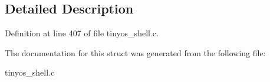 \subsection{Detailed Description}


Definition at line 407 of file tinyos\+\_\+shell.\+c.



The documentation for this struct was generated from the following file\+:\begin{DoxyCompactItemize}
\item 
tinyos\+\_\+shell.\+c\end{DoxyCompactItemize}

